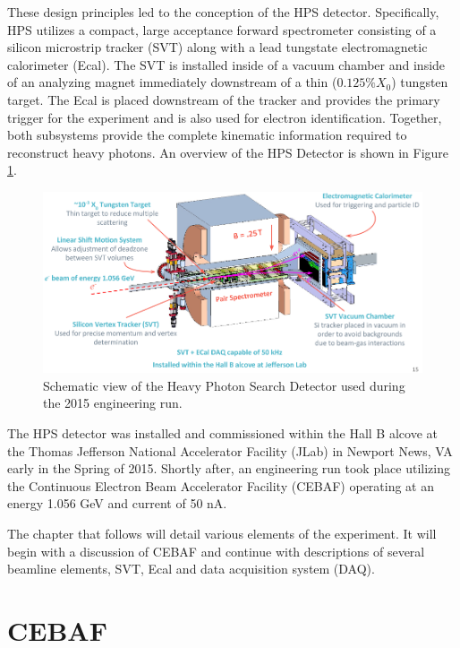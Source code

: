 These design principles led to the conception of the HPS detector.  
Specifically, HPS utilizes a compact, large acceptance forward spectrometer 
consisting of a silicon microstrip tracker (SVT) along with a lead tungstate
electromagnetic calorimeter (Ecal).  The SVT is installed inside of a vacuum
chamber and inside of an analyzing magnet immediately downstream of a thin
($0.125\%X_{0}$) tungsten target.
The Ecal is placed downstream of the tracker and provides the primary 
trigger for the experiment and is also used for electron identification. Together, 
both subsystems provide the complete kinematic information required to 
reconstruct heavy photons.  An overview of the HPS Detector is shown in Figure
\ref{fig:hps_detector}.
\begin{figure}[th]
    \centering
    \includegraphics[width=\textwidth]{images/hps_detector.png}
    \caption{Schematic view of the Heavy Photon Search Detector used during the
             2015 engineering run.}
    \label{fig:hps_detector}
\end{figure}

The HPS detector was installed and commissioned within the Hall B alcove at the
Thomas Jefferson National Accelerator Facility (JLab) in Newport News, VA early
in the Spring of 2015. Shortly after, an engineering run took place utilizing
the Continuous Electron Beam Accelerator Facility (CEBAF) operating at an 
energy 1.056 GeV and current of 50 nA.

The chapter that follows will detail various elements of the experiment.
It will begin with a discussion of CEBAF and continue with descriptions
of several beamline elements, SVT, Ecal and data acquisition system (DAQ).

\section{CEBAF}

